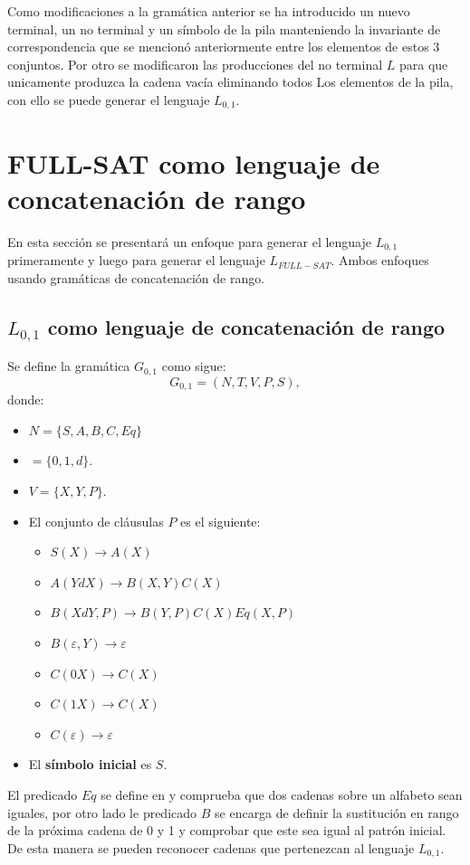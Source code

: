 Como modificaciones a la gramática anterior se ha introducido un nuevo terminal, un no terminal y un símbolo de la pila 
manteniendo la invariante de correspondencia que se mencionó anteriormente entre los elementos de estos 3 conjuntos. Por
otro se modificaron las producciones del no terminal $L$ para que unicamente produzca la cadena vacía eliminando todos Los
elementos de la pila, con ello se puede generar el lenguaje $L_{0,1}$.
\section{FULL-SAT como lenguaje de concatenación de rango}

En esta sección se presentará un enfoque para generar el lenguaje $L_{0,1}$ primeramente y luego para generar el lenguaje $L_{FULL-SAT}$.
Ambos enfoques usando gramáticas de concatenación de rango.

\subsection{$L_{0,1}$ como lenguaje de concatenación de rango}

Se define la gramática $G_{0,1}$ como sigue:
\[
    G_{0,1} = (N, T, V, P, S),
\]
donde:

\begin{itemize}
    \item $N=\{S,A,B,C,Eq\}$
    \item $=\{0,1,d\}$.
    \item $V=\{X,Y,P\}$.
    \item El conjunto de cláusulas $P$ es el siguiente:
          \begin{itemize}
              \item  $S(X)\to A(X)$
              \item $A(YdX)\to B(X,Y)C(X)$
              \item $B(XdY,P)\to B(Y,P) C(X) Eq(X,P)$
              \item $B(\varepsilon,Y)\to \varepsilon$
              \item $C(0X)\to C(X)$
              \item $C(1X)\to C(X)$
              \item $C(\varepsilon)\to \varepsilon$
          \end{itemize}
    \item El \textbf{símbolo inicial} es $S$.
\end{itemize}

El predicado $Eq$ se define en \cite{mainRCGBib} y comprueba que dos cadenas sobre un alfabeto sean iguales, por otro lado 
le predicado $B$ se encarga de definir la sustitución en rango de la próxima cadena de 0 y 1 y comprobar que este sea igual
al patrón inicial. De esta manera se pueden reconocer cadenas que pertenezcan al lenguaje $L_{0,1}$.


